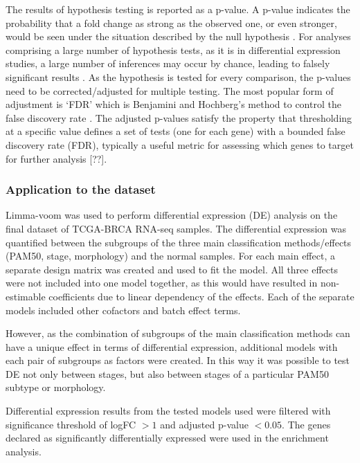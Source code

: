         The results of hypothesis testing is reported as a p-value. A p-value indicates the probability that a fold change as strong as the observed one, or even stronger, would be seen under the            situation described by the null hypothesis  \cite{Love2016RNA-SeqApproved}.  For analyses comprising a large number of hypothesis tests, as it is in differential expression studies, a large number of inferences may occur by chance, leading to falsely significant results \cite{pounds2006estimation}. As the hypothesis is tested for every comparison, the p-values need to be corrected/adjusted for multiple testing. The most popular form of adjustment is ‘FDR’ which is Benjamini and Hochberg’s method to control the false discovery rate \cite{BH1995}. The adjusted p-values satisfy the property that thresholding at a specific value defines a set of tests (one for each gene) with a bounded false discovery rate (FDR), typically a useful metric for assessing which genes to target for further analysis [??].



        \subsubsection{Application to the dataset}
        Limma-voom was used to perform differential expression (DE) analysis on the final dataset of TCGA-BRCA RNA-seq samples. The differential expression was quantified between the subgroups of the three main classification methods/effects (PAM50, stage, morphology) and the normal samples. 
        For each main effect, a separate design matrix was created and used to fit the model. All three effects were not included into one model together, as this would have resulted in non-estimable coefficients due to linear dependency of the effects. Each of the separate models included other cofactors and batch effect terms. 
        
        However, as the combination of subgroups of the main classification methods can have a unique effect in terms of differential expression, additional models with each pair of subgroups as factors were created. In this way it was possible to test DE not only between stages, but also between stages of a particular PAM50 subtype or morphology. 
        
        Differential expression results from the tested models used were filtered with significance threshold of logFC $>1$ and adjusted p-value $<0.05$. The genes declared as significantly differentially expressed were used in the enrichment analysis. 
        
